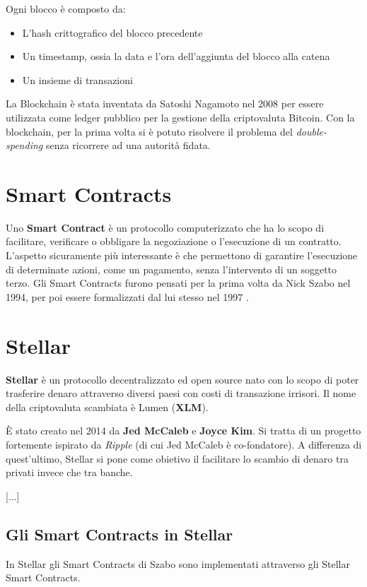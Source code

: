Ogni blocco è composto da:
\begin{itemize}
	\item L'hash crittografico del blocco precedente
	\item Un timestamp, ossia la data e l'ora dell'aggiunta del blocco alla catena
	\item Un insieme di transazioni
\end{itemize}
La Blockchain è stata inventata da Satoshi Nagamoto nel 2008 per essere utilizzata
come ledger pubblico per la gestione della criptovaluta Bitcoin. Con la blockchain,
per la prima volta si è potuto risolvere il problema del \textit{double-spending}
senza ricorrere ad una autorità fidata.

\section{Smart Contracts}
Uno \textbf{Smart Contract} è un protocollo computerizzato che ha lo scopo di
facilitare, verificare o obbligare la negoziazione o l'esecuzione di un contratto.
L'aspetto sicuramente più interessante è che permettono di garantire l'esecuzione
di determinate azioni, come un pagamento, senza l'intervento di un soggetto terzo.
Gli Smart Contracts furono pensati per la prima volta da Nick Szabo nel 1994, per poi
essere formalizzati dal lui stesso nel 1997 \cite{szabo-smart-contracts}.

\section{Stellar}

\textbf{Stellar} è un protocollo decentralizzato ed
open source nato con lo scopo di poter
trasferire denaro attraverso diversi
paesi con costi di transazione irrisori. Il nome della criptovaluta scambiata
è Lumen (\textbf{XLM}).

È stato creato nel 2014 da \textbf{Jed McCaleb} e \textbf{Joyce Kim}.
Si tratta di un progetto fortemente ispirato da \textit{Ripple} (di cui Jed McCaleb
è co-fondatore). A differenza di quest'ultimo, Stellar si pone come obietivo
il facilitare lo scambio di denaro tra privati invece che tra banche.

[...]


\subsection{Gli Smart Contracts in Stellar}
\label{subsec:stellar smart contracts}
In Stellar gli Smart Contracts di Szabo sono implementati
attraverso gli Stellar Smart Contracts.

